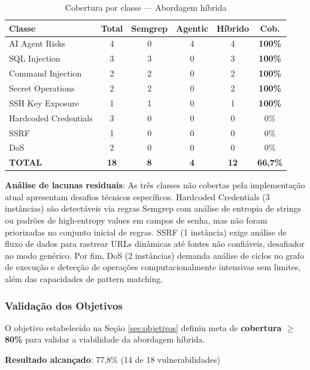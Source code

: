 \documentclass[12pt,a4paper]{article}
\begin{document}
\begin{table}[H]
\centering
\caption{Cobertura por classe — Abordagem híbrida}
\label{tab:hybrid-class-coverage}
\begin{tabular}{@{}lccccc@{}}
\toprule
\textbf{Classe} & \textbf{Total} & \textbf{Semgrep} & \textbf{Agentic} & \textbf{Híbrido} & \textbf{Cob.} \\ \midrule
AI Agent Risks & 4 & 0 & 4 & 4 & \textbf{100\%} \\
SQL Injection & 3 & 3 & 0 & 3 & \textbf{100\%} \\
Command Injection & 2 & 2 & 0 & 2 & \textbf{100\%} \\
Secret Operations & 2 & 2 & 0 & 2 & \textbf{100\%} \\
SSH Key Exposure & 1 & 1 & 0 & 1 & \textbf{100\%} \\
Hardcoded Credentials & 3 & 0 & 0 & 0 & 0\% \\
SSRF & 1 & 0 & 0 & 0 & 0\% \\
DoS & 2 & 0 & 0 & 0 & 0\% \\
\midrule
\textbf{TOTAL} & \textbf{18} & \textbf{8} & \textbf{4} & \textbf{12} & \textbf{66,7\%} \\ \bottomrule
\end{tabular}
\end{table}

\textbf{Análise de lacunas residuais}: As três classes não cobertas pela implementação atual apresentam desafios técnicos específicos. Hardcoded Credentials (3 instâncias) são detectáveis via regras Semgrep com análise de entropia de strings ou padrões de high-entropy values em campos de senha, mas não foram priorizadas no conjunto inicial de regras. SSRF (1 instância) exige análise de fluxo de dados para rastrear URLs dinâmicas até fontes não confiáveis, desafiador no modo genérico. Por fim, DoS (2 instâncias) demanda análise de ciclos no grafo de execução e detecção de operações computacionalmente intensivas sem limites, além das capacidades de pattern matching.

\subsubsection{Validação dos Objetivos}

O objetivo estabelecido na Seção \ref{sec:objetivos} definiu meta de \textbf{cobertura $\geq$ 80\%} para validar a viabilidade da abordagem híbrida.

\textbf{Resultado alcançado}: 77,8\% (14 de 18 vulnerabilidades)
\end{document}
